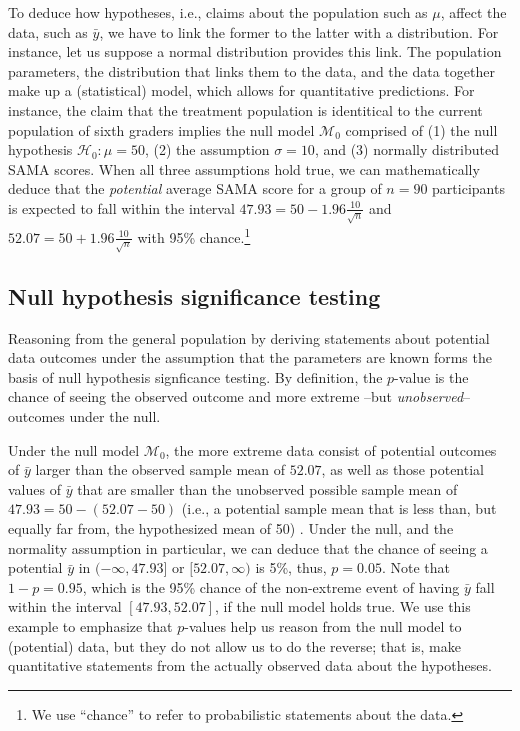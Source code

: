 \documentclass[english,,doc,floatsintext]{apa6}
\let\rmarkdownfootnote\footnote%
\def\footnote{\protect\rmarkdownfootnote}
\begin{document}
To deduce how hypotheses, i.e., claims about the population such as \(\mu\), affect the data, such as \(\bar{y}\), we have to link the former to the latter with a distribution. For instance, let us suppose a normal distribution provides this link. The population parameters, the distribution that links them to the data, and the data together make up a (statistical) model, which allows for quantitative predictions. For instance, the claim that the treatment population is identitical to the current population of sixth graders implies the null model \(\mathcal{M}_{0}\) comprised of (1) the null hypothesis \(\mathcal{H}_{0}: \mu = 50\), (2) the assumption \(\sigma = 10\), and (3) normally distributed SAMA scores. When all three assumptions hold true, we can mathematically deduce that the \emph{potential} average SAMA score for a group of \(n = 90\) participants is expected to fall within the interval \(47.93 = 50 - 1.96 \frac{10}{\sqrt{n}}\) and \(52.07 = 50 + 1.96 \frac{10}{\sqrt{n}}\) with 95\% chance.\footnote{We use ``chance'' to refer to probabilistic statements about the data.}

\hypertarget{null-hypothesis-significance-testing}{%
\subsection{Null hypothesis significance testing}\label{null-hypothesis-significance-testing}}

Reasoning from the general population by deriving statements about potential data outcomes under the assumption that the parameters are known forms the basis of null hypothesis signficance testing. By definition, the \(p\)-value is the chance of seeing the observed outcome and more extreme --but \emph{unobserved}-- outcomes under the null.

Under the null model \(\mathcal{M}_{0}\), the more extreme data consist of potential outcomes of \(\bar{y}\) larger than the observed sample mean of \(52.07\), as well as those potential values of \(\bar{y}\) that are smaller than the unobserved possible sample mean of \(47.93 = 50 - (52.07-50)\) (i.e., a potential sample mean that is less than, but equally far from, the hypothesized mean of 50) . Under the null, and the normality assumption in particular, we can deduce that the chance of seeing a potential \(\bar{y}\) in \((- \infty, 47.93]\) or \([52.07, \infty)\) is 5\%, thus, \(p=0.05\). Note that \(1 - p = 0.95\), which is the 95\% chance of the non-extreme event of having \(\bar{y}\) fall within the interval \([47.93, 52.07]\), if the null model holds true. We use this example to emphasize that \(p\)-values help us reason from the null model to (potential) data, but they do not allow us to do the reverse; that is, make quantitative statements from the actually observed data about the hypotheses.
\end{document}
